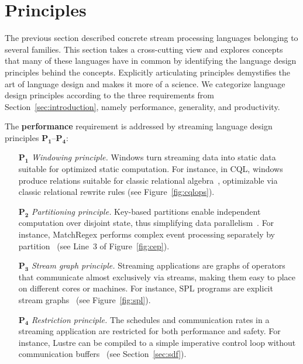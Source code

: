 \section{Principles}\label{sec:principles}

The previous section described concrete stream processing languages
belonging to several families. This section takes a cross-cutting view
and explores concepts that many of these languages have in common by
identifying the language design principles behind the concepts.
Explicitly articulating principles demystifies the art of language
design and makes it more of a science. We categorize language design
principles according to the three requirements from
Section~\ref{sec:introduction}, namely performance, generality, and
productivity.

The \textbf{performance} requirement is addressed by streaming
language design principles $\mathbf{P_1}$--$\mathbf{P_4}$:
\begin{itemize}[leftmargin=6mm]
  \item[$\mathbf{P_1}$] \emph{Windowing principle.} Windows turn streaming
    data into static data suitable for optimized static computation.
    For instance, in CQL, windows produce relations suitable for
    classic relational algebra~\cite{arasu_babu_widom_2006},
    optimizable via classic relational rewrite rules (see
    Figure~\ref{fig:cqlops}).
  \item[$\mathbf{P_2}$] \emph{Partitioning principle.} Key-based partitions
    enable independent computation over disjoint state, thus
    simplifying data parallelism~\cite{schneider_et_al_2015}.
    For instance, MatchRegex performs complex event processing separately by
    partition~\cite{hirzel_2012} (see Line~3 of Figure~\ref{fig:cep}).
  \item[$\mathbf{P_3}$] \emph{Stream graph principle.} Streaming
    applications are graphs of operators that communicate almost
    exclusively via streams, making them easy to place on different
    cores or machines. For instance, SPL programs are explicit stream
    graphs~\cite{hirzel_schneider_gedik_2017} (see
    Figure~\ref{fig:spl}).
  \item[$\mathbf{P_4}$] \emph{Restriction principle.} The schedules and
    communication rates in a streaming application are restricted for
    both performance and safety. For instance, Lustre can be compiled
    to a simple imperative control loop without communication
    buffers~\cite{lustre_1987} (see Section~\ref{sec:sdf}).
\end{itemize}

